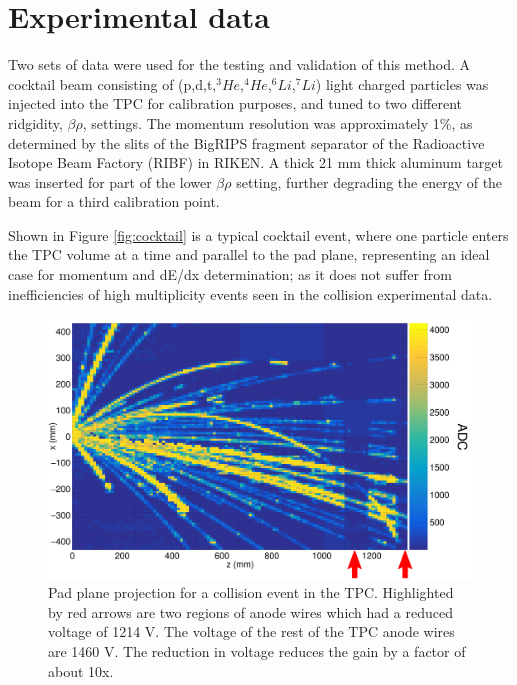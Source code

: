 \documentclass[review]{elsarticle}
\begin{document}
\section{Experimental data}
Two sets of data were used for the testing and validation of this method. A cocktail beam consisting of (p,d,t,${}^3He$,${}^4He$,${}^6Li$,${}^7Li$) light charged particles was injected into the TPC for calibration purposes, and tuned to two different ridgidity, $\beta\rho$, settings. The momentum resolution was approximately 1\%, as determined by the slits of the BigRIPS fragment separator of the Radioactive Isotope Beam Factory (RIBF) in RIKEN. A thick 21 mm thick aluminum target was inserted for part of the lower $\beta\rho$ setting, further degrading the energy of the beam for a third calibration point. 

Shown in Figure \ref{fig:cocktail} is a typical cocktail event, where one particle enters the TPC volume at a time and parallel to the pad plane, representing an ideal case for momentum and dE/dx determination; as it does not suffer from inefficiencies of high multiplicity events seen in the collision experimental data.  

\begin{figure}[H]
\includegraphics[width=\linewidth]{data.pdf}
\caption{Pad plane projection for a collision event in the TPC. Highlighted by red arrows are two regions of anode wires which had a reduced voltage of 1214 V. The voltage of the rest of the TPC anode wires are 1460 V. The reduction in voltage reduces the gain by a factor of about 10x. }
\label{fig:data}
\end{figure}
\end{document}
